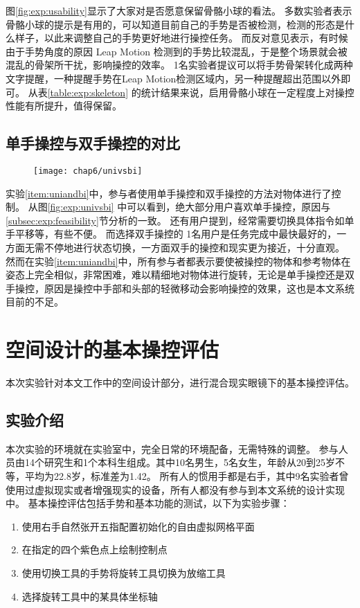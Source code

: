 图\ref{fig:exp:usability}显示了大家对是否愿意保留骨骼小球的看法。
多数实验者表示骨骼小球的提示是有用的，可以知道目前自己的手势是否被检测，检测的形态是什么样子，以此来调整自己的手势更好地进行操控任务。
而反对意见表示，有时候由于手势角度的原因 Leap Motion 检测到的手势比较混乱，于是整个场景就会被混乱的骨架所干扰，影响操控的效率。
1名实验者提议可以将手势骨架转化成两种文字提醒，一种提醒手势在Leap Motion检测区域内，另一种提醒超出范围以外即可。 
从表\ref{table:exp:skeleton} 的统计结果来说，启用骨骼小球在一定程度上对操控性能有所提升，值得保留。

\subsection{单手操控与双手操控的对比}
\begin{figure}[!htp]
  \centering
  \texttt{[image: chap6/univsbi]}
\end{figure}

实验\ref{item:uniandbi}中，参与者使用单手操控和双手操控的方法对物体进行了控制。
从图\ref{fig:exp:univsbi} 中可以看到，绝大部分用户喜欢单手操控，原因与\ref{subsec:exp:feasibility}节分析的一致。
还有用户提到，经常需要切换具体指令如单手平移等，有些不便。
而选择双手操控的 1名用户是任务完成中最快最好的，一方面无需不停地进行状态切换，一方面双手的操控和现实更为接近，十分直观。
然而在实验\ref{item:uniandbi}中，所有参与者都表示要使被操控的物体和参考物体在姿态上完全相似，非常困难，难以精细地对物体进行旋转，无论是单手操控还是双手操控，原因是操控中手部和头部的轻微移动会影响操控的效果，这也是本文系统目前的不足。

\section{空间设计的基本操控评估}
\label{sec:exp:pilot}
本次实验针对本文工作中的空间设计部分，进行混合现实眼镜下的基本操控评估。

\subsection{实验介绍}
本次实验的环境就在实验室中，完全日常的环境配备，无需特殊的调整。
参与人员由14个研究生和1个本科生组成。其中10名男生，5名女生，年龄从20到25岁不等，平均为22.8岁，标准差为1.42。
所有人的惯用手都是右手，其中9名实验者曾使用过虚拟现实或者增强现实的设备，所有人都没有参与到本文系统的设计实现中。
基本操控评估包括手势和基本功能的测试，以下为实验步骤：
\begin{enumerate}
\item 使用右手自然张开五指配置初始化的自由虚拟网格平面
\item 在指定的四个紫色点上绘制控制点
\label{exp:cp}
\item 使用切换工具的手势将旋转工具切换为放缩工具
\item 选择旋转工具中的某具体坐标轴
\end{enumerate}

